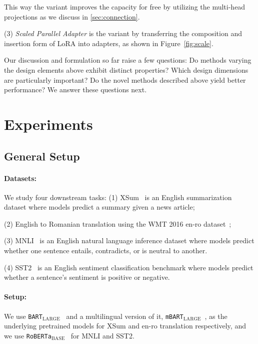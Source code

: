 This way the variant improves the capacity for free by utilizing the multi-head projections as we discuss in \textsection\ref{sec:connection}. 

(3) \emph{Scaled Parallel Adapter} is the variant by transferring the composition and insertion form of LoRA into adapters, as shown in Figure~\ref{fig:scale}.

Our discussion and formulation so far raise a few questions: Do methods varying the design elements above exhibit distinct properties? Which design dimensions are particularly important? Do the novel methods described above yield better performance? We answer these questions next. 

\section{Experiments}
\label{sec:exp}

\subsection{General Setup}
\label{sec:exp-setup}
\paragraph{Datasets:}
We study four downstream tasks: (1) XSum~\citep{xsum-emnlp} is an English summarization dataset where models predict a summary given a news article; 

(2) English to Romanian translation using the WMT 2016 en-ro  dataset~\citep{bojar2016findings};

(3) MNLI~\citep{N18-1101} is an English natural language inference dataset where models predict whether one sentence entails, contradicts, or is neutral to another.

(4) SST2~\citep{socher2013recursive} is an English sentiment classification benchmark where models predict whether a sentence's sentiment is positive or negative. 

\paragraph{Setup:}
We use \texttt{BART$_\text{LARGE}$}~\citep{lewis-etal-2020-bart} and a multilingual version of it, \texttt{mBART$_\text{LARGE}$}~\citep{TACL2107}, as the underlying pretrained models for XSum and en-ro translation respectively, and we use \texttt{RoBERTa$_\text{BASE}$}~\citep{liu2019roberta} for MNLI and SST2. 


